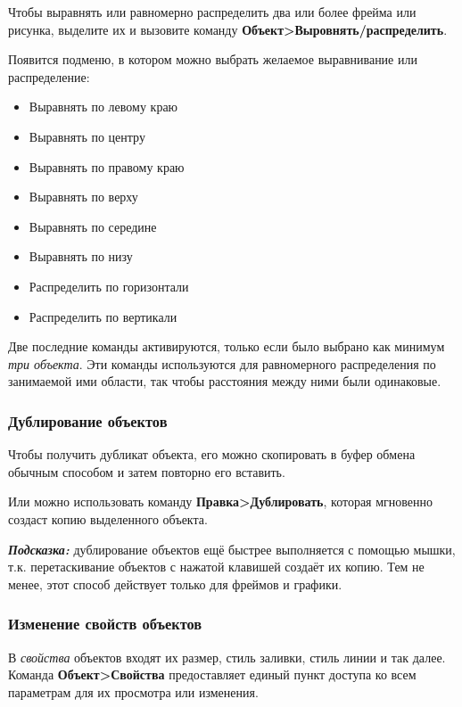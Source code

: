 ﻿\documentclass[a4paper,10pt]{article}
\begin{document}
Чтобы выравнять или равномерно распределить два или более фрейма или рисунка, выделите их и вызовите команду \textbf{Объект>Выровнять/распределить}.

Появится подменю, в котором можно выбрать желаемое выравнивание или распределение:

\begin{itemize}
 \item Выравнять по левому краю
 \item Выравнять по центру
 \item Выравнять по правому краю
 \item Выравнять по верху
 \item Выравнять по середине
 \item Выравнять по низу
 \newline
 \item Распределить по горизонтали
 \item Распределить по вертикали
\end{itemize}

Две последние команды активируются, только если было выбрано как минимум \textit{три объекта}. Эти команды используются для равномерного распределения по занимаемой ими области, так чтобы расстояния между ними были одинаковые.

\subsubsection{Дублирование объектов}
Чтобы получить дубликат объекта, его можно скопировать в буфер обмена обычным способом и затем повторно его вставить.

Или можно использовать команду \textbf{Правка>Дублировать}, которая мгновенно создаст копию выделенного объекта.

\begin{mdframed}[backgroundcolor=blue!10]
\textbf{\textit{Подсказка:}} дублирование объектов ещё быстрее выполняется с помощью мышки, т.к. перетаскивание объектов с нажатой клавишей  создаёт их копию. Тем не менее, этот способ действует только для фреймов и графики.
\end{mdframed}

\subsubsection{Изменение свойств объектов}
В \textit{свойства} объектов входят их размер, стиль заливки, стиль линии и так далее. Команда \textbf{Объект>Свойства} предоставляет единый пункт доступа ко всем параметрам для их просмотра или изменения.
\end{document}
